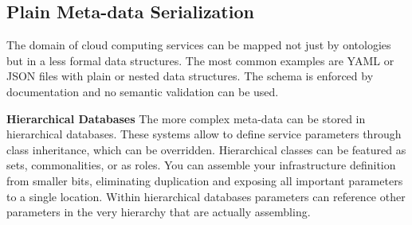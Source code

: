 \subsection{Plain Meta-data Serialization}

The domain of cloud computing services can be mapped not just by ontologies but in a less formal data structures. The most common examples are YAML or JSON files with plain or nested data structures. The schema is enforced by documentation and no semantic validation can be used.

\textbf{Hierarchical Databases}
The more complex meta-data can be stored in hierarchical databases. These systems  allow to define service parameters through class inheritance, which can be overridden. Hierarchical classes can be featured as sets, commonalities, or as roles. You can assemble your infrastructure definition from smaller bits, eliminating duplication and exposing all important parameters to a single location. Within hierarchical databases parameters can reference other parameters in the very hierarchy that are actually assembling.






